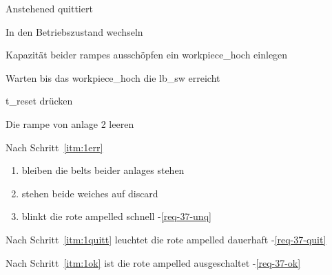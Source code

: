 \label{abntest-fehlerumgang}

\begin{ablauf}{Anstehened quittiert}
    \item In den Betriebszustand wechseln
    \item Kapazität beider \glspl{rampe} ausschöpfen ein \gls{workpiece_hoch} einlegen
    \item \label{itm:1err} Warten bis das \gls{workpiece_hoch} die \gls{lb_sw} erreicht
    \item\label{itm:1quitt} \gls{t_reset} drücken
    \item\label{itm:1ok} Die \gls{rampe} von \gls{anlage} 2 leeren
\end{ablauf}
\begin{erwartung}
    \item Nach Schritt~\ref{itm:1err}
    \begin{enumerate}
        \item bleiben die \glspl{belt} beider \glspl{anlage} stehen 
        \item stehen beide \glspl{weiche} auf \gls{discard} 
        \item blinkt die rote \gls{ampelled} schnell -\ref{req-37-unq}
    \end{enumerate}
    \item Nach Schritt~\ref{itm:1quitt} leuchtet die rote \gls{ampelled} dauerhaft -\ref{req-37-quit}
    \item Nach Schritt~\ref{itm:1ok} ist die rote \gls{ampelled} ausgeschaltet -\ref{req-37-ok}
\end{erwartung}

